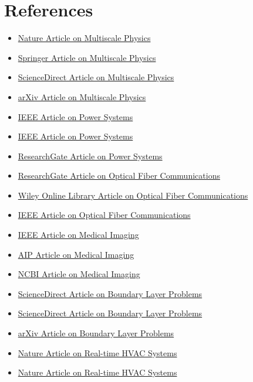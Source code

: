 \documentclass[12pt]{article}
\begin{document}
	\section{References}
	\begin{itemize}
		\item \href{https://www.nature.com/articles/s42254-021-00314-5}{Nature Article on Multiscale Physics}
		\item \href{https://link.springer.com/article/10.1007/s10915-022-01939-z}{Springer Article on Multiscale Physics}
		\item \href{https://www.sciencedirect.com/science/article/pii/S0021999121000875}{ScienceDirect Article on Multiscale Physics}
		\item \href{https://arxiv.org/abs/2308.06672}{arXiv Article on Multiscale Physics}
		\item \href{https://ieeexplore.ieee.org/abstract/document/9743327}{IEEE Article on Power Systems}
		\item \href{https://ieeexplore.ieee.org/document/9282004}{IEEE Article on Power Systems}
		\item \href{https://www.researchgate.net/publication/359487132_Applications_of_Physics-Informed_Neural_Networks_in_Power_Systems_-A_Review}{ResearchGate Article on Power Systems}
		\item \href{https://www.researchgate.net/publication/361772364_Applications_of_Physics-Informed_Neural_Network_for_Optical_Fiber_Communications}{ResearchGate Article on Optical Fiber Communications}
		\item \href{https://onlinelibrary.wiley.com/doi/10.1002/lpor.202100483}{Wiley Online Library Article on Optical Fiber Communications}
		\item \href{https://ieeexplore.ieee.org/document/9489953/}{IEEE Article on Optical Fiber Communications}
		\item \href{https://ieeexplore.ieee.org/document/9897269}{IEEE Article on Medical Imaging}
		\item \href{https://pubs.aip.org/aip/app/article/7/1/010802/2835099}{AIP Article on Medical Imaging}
		\item \href{https://www.ncbi.nlm.nih.gov/pmc/articles/PMC9437127}{NCBI Article on Medical Imaging}
		\item \href{https://www.sciencedirect.com/science/article/pii/S0021999122008312}{ScienceDirect Article on Boundary Layer Problems}
		\item \href{https://www.sciencedirect.com/science/article/pii/S0735193322000124}{ScienceDirect Article on Boundary Layer Problems}
		\item \href{https://arxiv.org/abs/2310.02548}{arXiv Article on Boundary Layer Problems}
		\item \href{https://www.nature.com/articles/s41598-023-36799-6}{Nature Article on Real-time HVAC Systems}
		\item \href{https://www.nature.com/articles/s41598-023-43325-1}{Nature Article on Real-time HVAC Systems}
	\end{itemize}
	
\end{document}
